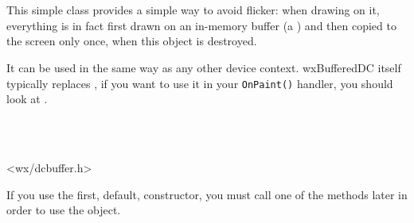 
\section{}\label{wxbuffereddc}

This simple class provides a simple way to avoid flicker: when drawing on it,
everything is in fact first drawn on an in-memory buffer (a 
) and then copied to the screen only once, when this
object is destroyed.

It can be used in the same way as any other device context. wxBufferedDC itself
typically replaces , if you want to use it in
your \texttt{OnPaint()} handler, you should look at
.


\\
\\


<wx/dcbuffer.h>





\label{wxbuffereddcctor}




If you use the first, default, constructor, you must call one of the 
 methods later in order to use the object.

